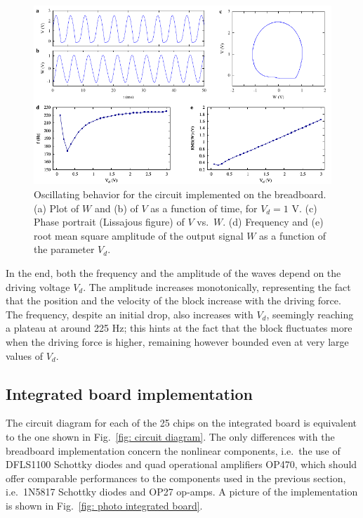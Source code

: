 \begin{figure}[!htbp]
    \centering
    \includegraphics[width=\linewidth]{../blocks/1_block/breadboard/single_block.pdf}
    \caption{Oscillating behavior for the circuit implemented on
    the breadboard. (a) Plot of $W$ and (b) of $V$ as a function of time,
    for $V_d=1$ V.
    (c) Phase portrait (Lissajous figure) of $V$ vs.\ $W$. (d)
    Frequency and (e) root mean square amplitude of the
    output signal $W$ as a function of the parameter $V_d$.
    }\label{fig:oscillation breadboard}
\end{figure}

In the end, both the frequency and the amplitude of the waves depend on the driving voltage $V_d$.
The amplitude increases monotonically, representing the fact that the position and the velocity of
the block increase with the driving force. The frequency, despite an initial drop, also increases with
$V_d$, seemingly reaching a plateau at around 225 Hz; this hints at the fact that the block fluctuates
more when the driving force is higher, remaining however bounded even at very large values of $V_d$.

\subsection{Integrated board implementation}\label{subsec:integrated board implementation}

The circuit diagram for each of the 25 chips on the integrated board is equivalent to the
one shown in Fig.~\ref{fig: circuit diagram}. The only differences with the breadboard implementation
concern the nonlinear components, i.e.\ the use of DFLS1100 Schottky diodes and quad operational
amplifiers OP470, which should offer comparable performances to the components used in the previous section,
i.e.\ 1N5817 Schottky diodes and OP27 op-amps.
A picture of the implementation is shown in Fig.~\ref{fig: photo integrated board}.

